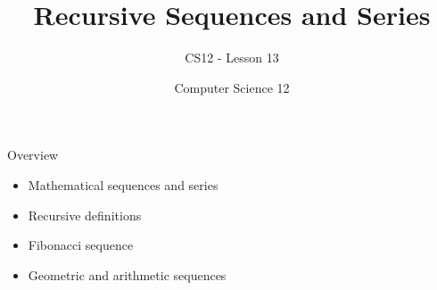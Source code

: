 \documentclass[10pt]{beamer}
\title{Recursive Sequences and Series}
\subtitle{CS12 - Lesson 13}
\author{Computer Science 12}
\date{}
\begin{document}
\begin{frame}
    \titlepage
\end{frame}

\begin{frame}{Overview}
    \begin{itemize}
        \item Mathematical sequences and series
        \item Recursive definitions
        \item Fibonacci sequence
        \item Geometric and arithmetic sequences
    \end{itemize}
\end{frame}

\end{document}
